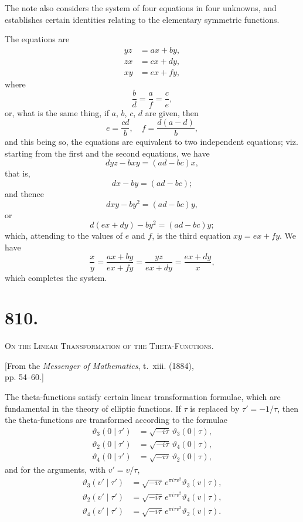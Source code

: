 \documentclass[11pt,a4paper]{article}
\theoremstyle{definition}
\theoremstyle{remark}
\begin{document}
The note also considers the system of four equations in four unknowns, and establishes certain identities relating to the elementary symmetric functions.

The equations are
\[
\begin{aligned}
yz &= ax + by, \\
zx &= cx + dy, \\
xy &= ex + fy,
\end{aligned}
\]
where
\[
\frac{b}{d} = \frac{a}{f} = \frac{c}{e},
\]
or, what is the same thing, if $a$, $b$, $c$, $d$ are given, then
\[
e = \frac{cd}{b}, \quad f = \frac{d(a-d)}{b},
\]
and this being so, the equations are equivalent to two independent equations; viz. starting from the first and the second equations, we have
\[
dyz - bxy = (ad - bc)x,
\]
that is,
\[
dx - by = (ad - bc);
\]
and thence
\[
dxy - by^2 = (ad - bc)y,
\]
or
\[
d(ex + dy) - by^2 = (ad - bc)y;
\]
which, attending to the values of $e$ and $f$, is the third equation $xy = ex + fy$. We have
\[
\frac{x}{y} = \frac{ax + by}{ex + fy} = \frac{yz}{ex + dy} = \frac{ex + dy}{x},
\]
which completes the system.



\newpage
\section*{810.}
\begin{center}
{\large\scshape On the Linear Transformation of the Theta-Functions.}
\end{center}

\begin{flushright}
\small[From the \textit{Messenger of Mathematics}, t.~xiii. (1884),\\
pp. 54--60.]
\end{flushright}

The theta-functions satisfy certain linear transformation formulae, which are fundamental in the theory of elliptic functions. If $\tau$ is replaced by $\tau' = -1/\tau$, then the theta-functions are transformed according to the formulae
\[
\begin{aligned}
\vartheta_3(0 \mid \tau') &= \sqrt{-i\tau} \, \vartheta_3(0 \mid \tau), \\
\vartheta_2(0 \mid \tau') &= \sqrt{-i\tau} \, \vartheta_4(0 \mid \tau), \\
\vartheta_4(0 \mid \tau') &= \sqrt{-i\tau} \, \vartheta_2(0 \mid \tau),
\end{aligned}
\]
and for the arguments, with $v' = v/\tau$,
\[
\begin{aligned}
\vartheta_3(v' \mid \tau') &= \sqrt{-i\tau} \, e^{\pi i \tau v^2} \vartheta_3(v \mid \tau), \\
\vartheta_2(v' \mid \tau') &= \sqrt{-i\tau} \, e^{\pi i \tau v^2} \vartheta_4(v \mid \tau), \\
\vartheta_4(v' \mid \tau') &= \sqrt{-i\tau} \, e^{\pi i \tau v^2} \vartheta_2(v \mid \tau).
\end{aligned}
\]
\end{document}
